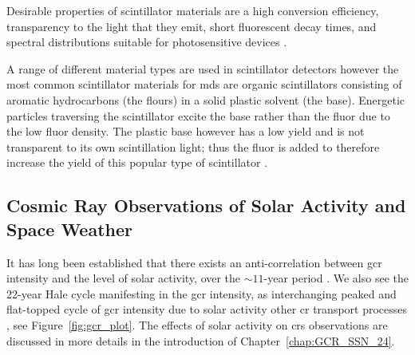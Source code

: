 Desirable properties of scintillator materials are a high conversion efficiency, transparency to the light that they emit, short fluorescent decay times, and spectral distributions suitable for photosensitive devices \citep{gloeckler_-situ_2010}. 

A range of different material types are used in scintillator detectors however the most common scintillator materials for \glspl{md} are organic scintillators consisting of aromatic hydrocarbons (the flours) in a solid plastic solvent (the base). Energetic particles traversing the scintillator excite the base rather than the fluor due to the low fluor density. The plastic base however has a low yield and is not transparent to its own scintillation light; thus the fluor is added to therefore increase the yield of this popular type of scintillator \citep{fokkema_hisparc_2012}.





\subsection{Cosmic Ray Observations of Solar Activity and Space Weather}

It has long been established that there exists an anti-correlation between \gls{gcr} intensity and the level of solar activity, over the $\sim11$-year period \citep{forbush_cosmic-ray_1958, parker_passage_1965, usoskin_correlative_1998, van_allen_modulation_2000}. We also see the 22-year Hale cycle manifesting in the \gls{gcr} intensity, as interchanging peaked and flat-topped cycle of \gls{gcr} intensity due to solar activity other \gls{cr} transport processes \citep{aslam_solar_2012, thomas_22-year_2014}, see Figure~\ref{fig:gcr_plot}. The effects of solar activity on \glspl{cr} observations are discussed in more details in the introduction of Chapter~\ref{chap:GCR_SSN_24}.

